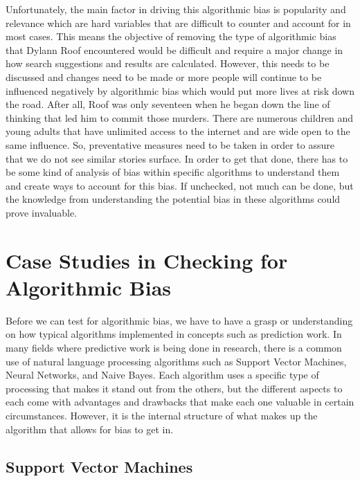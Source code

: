 \documentclass[sigconf]{acmart}
\begin{document}
Unfortunately, the main factor in driving this algorithmic bias is popularity and relevance which are hard variables that are difficult to counter and account for in most cases. This means the objective of removing the type of algorithmic bias that Dylann Roof encountered would be difficult and require a major change in how search suggestions and results are calculated. However, this needs to be discussed and changes need to be made or more people will continue to be influenced negatively by algorithmic bias which would put more lives at risk down the road. After all, Roof was only seventeen when he began down the line of thinking that led him to commit those murders. There are numerous children and young adults that have unlimited access to the internet and are wide open to the same influence. So, preventative measures need to be taken in order to assure that we do not see similar stories surface. In order to get that done, there has to be some kind of analysis of bias within specific algorithms to understand them and create ways to account for this bias. If unchecked, not much can be done, but the knowledge from understanding the potential bias in these algorithms could prove invaluable.

\section{Case Studies in Checking for Algorithmic Bias}

Before we can test for algorithmic bias, we have to have a grasp or understanding on how typical algorithms implemented in concepts such as prediction work. In many fields where predictive work is being done in research, there is a common use of natural language processing algorithms such as Support Vector Machines, Neural Networks, and Naive Bayes. Each algorithm uses a specific type of processing that makes it stand out from the others, but the different aspects to each come with advantages and drawbacks that make each one valuable in certain circumstances. However, it is the internal structure of what makes up the algorithm that allows for bias to get in.

\subsection{Support Vector Machines}
\end{document}
